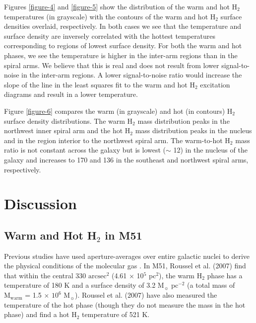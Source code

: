 \documentclass[manuscript]{aastex}
\begin{document}
Figures \ref{figure-4} and \ref{figure-5} show the distribution 
of the warm and hot H$_2$ temperatures (in grayscale) with 
the contours of the warm and hot H$_2$ surface densities overlaid, respectively.  In 
both cases we see that the temperature and surface density 
are inversely correlated with the hottest temperatures 
corresponding to regions of lowest surface density.  For 
both the warm and hot phases, we see the temperature 
is higher in the inter-arm regions than in the spiral arms.  We believe that this 
is real and does not result from lower signal-to-noise 
in the inter-arm regions.  A lower signal-to-noise 
ratio would increase the slope of the line in the least 
squares fit to the warm and hot H$_2$ excitation 
diagrams and result in a lower temperature.  


Figure \ref{figure-6} compares the warm (in grayscale) 
and hot (in contours) H$_2$ surface density distributions.   
The warm $\mathrm{H_2}$ mass distribution peaks
in the northwest inner spiral arm and the hot H$_2$ 
mass distribution peaks in the nucleus and in the 
region interior to the northwest spiral arm.  The warm-to-hot 
$\mathrm{H_2}$ mass ratio is not constant across 
the galaxy but is lowest ($\sim$ 12) in the nucleus of the 
galaxy and increases to 170 and 136 in the southeast 
and northwest spiral arms, respectively.

\section{Discussion}

\subsection{Warm and Hot H$_2$ in M51}

Previous studies have used aperture-averages over entire galactic
nuclei to derive the physical conditions of the molecular gas
\citep{rig02, hig06, rou07}.  In M51, Roussel et al. (2007) find that within
the central 330 $\mathrm{arcsec^2}$ (4.61 $\times$ 10$^5$ pc$^2$),
the warm $\mathrm{H_2}$ phase has a temperature of 180 K and 
a surface density of 3.2 $\mathrm{M_\sun}$ $\mathrm{pc^{-2}}$ 
(a total mass of $\mathrm{M_{warm}}$ = 1.5 $\times$ $\mathrm{10^6}$
$\mathrm{M_\sun}$).  Roussel et al. (2007) have also measured the temperature of
the hot phase (though they do not measure the mass in the hot phase)
and find a hot $\mathrm{H_2}$ temperature of 521 K.
\end{document}
